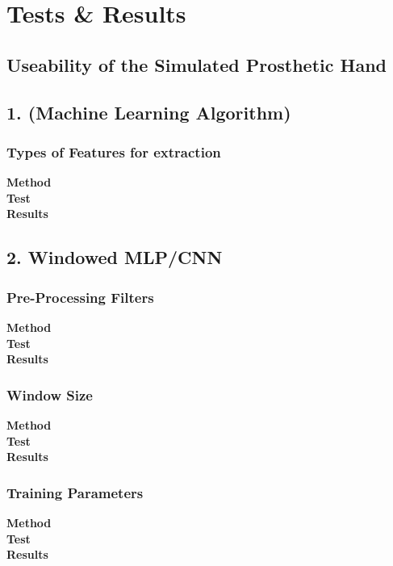 \documentclass[../main.tex]{subfiles}
\begin{document}
\section{Tests \& Results}


\subsection{Useability of the Simulated Prosthetic Hand}


\subsection{1. (Machine Learning Algorithm)}

\subsubsection{Types of Features for extraction}
\textbf{Method}\\
\textbf{Test}\\
\textbf{Results}\\

\subsection{2. Windowed MLP/CNN}

\subsubsection{Pre-Processing Filters}
\textbf{Method}\\
\textbf{Test}\\
\textbf{Results}\\

\subsubsection{Window Size}
\textbf{Method}\\
\textbf{Test}\\
\textbf{Results}\\

\subsubsection{Training Parameters}
\textbf{Method}\\
\textbf{Test}\\
\textbf{Results}\\
\end{document}
